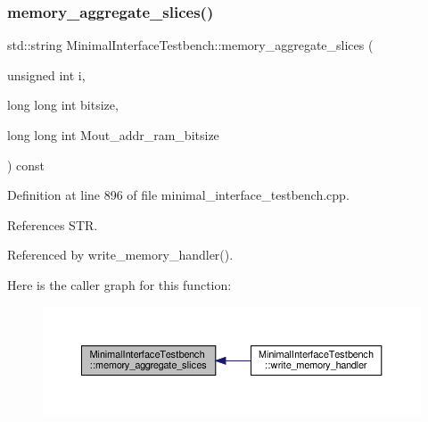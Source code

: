\subsubsection{\texorpdfstring{memory\+\_\+aggregate\+\_\+slices()}{memory\_aggregate\_slices()}}
{\footnotesize\ttfamily std\+::string Minimal\+Interface\+Testbench\+::memory\+\_\+aggregate\+\_\+slices (\begin{DoxyParamCaption}\item[{unsigned int}]{i,  }\item[{long long int}]{bitsize,  }\item[{long long int}]{Mout\+\_\+addr\+\_\+ram\+\_\+bitsize }\end{DoxyParamCaption}) const\hspace{0.3cm}{\ttfamily [protected]}}



Definition at line 896 of file minimal\+\_\+interface\+\_\+testbench.\+cpp.



References S\+TR.



Referenced by write\+\_\+memory\+\_\+handler().

Here is the caller graph for this function\+:
\nopagebreak
\begin{figure}[H]
\begin{center}
\leavevmode
\includegraphics[width=350pt]{d0/dba/classMinimalInterfaceTestbench_ade0c8242d6dadb2937939d9b31d12831_icgraph}
\end{center}
\end{figure}
\mbox{\label{classMinimalInterfaceTestbench_ad133b062afb651685cf860a0b218d330}} 
